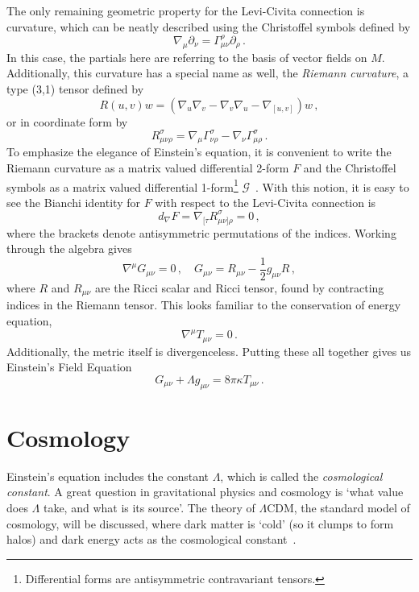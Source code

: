 The only remaining geometric property for the Levi-Civita connection is curvature, which can be neatly described using the Christoffel symbols defined by
\begin{equation}
    \nabla_\mu\partial_\nu = \Gamma^{\rho}_{\mu\nu}\partial_\rho\,.
\end{equation}
In this case, the partials here are referring to the basis of vector fields on $M$. Additionally, this curvature has a special name as well, the \textit{Riemann curvature}, a type (3,1) tensor defined by
\begin{equation}
    R(u,v)w = (\nabla_u\nabla_v-\nabla_v\nabla_u - \nabla_{[u,v]})w\,,
\end{equation}
or in coordinate form by
\begin{equation}
    R_{\mu\nu\rho}^\sigma  = \nabla_\mu \Gamma^\sigma_{\nu\rho} - \nabla_\nu\Gamma^{\sigma}_{\mu\rho}\,.
\end{equation}
To emphasize the elegance of Einstein's equation, it is convenient to write the Riemann curvature as a matrix valued differential 2-form $F$ and the Christoffel symbols as a matrix valued differential 1-form\footnote{Differential forms are antisymmetric contravariant tensors.} $\mathcal{G}$~\cite{baez_john_gauge_1994}. With this notion, it is easy to see the Bianchi identity for $F$ with respect to the Levi-Civita connection is
\begin{equation}
    d_{\nabla}F = \nabla_{[\tau}R^\sigma_{\mu\nu]\rho} = 0\,,
\end{equation}
where the brackets denote antisymmetric permutations of the indices. Working through the algebra gives
\begin{equation}
    \nabla^\mu G_{\mu\nu} = 0\,,\quad G_{\mu\nu} = R_{\mu\nu}-\frac{1}{2}g_{\mu\nu}R\,,
\end{equation}
where $R$ and $R_{\mu\nu}$ are the Ricci scalar and Ricci tensor, found by contracting indices in the Riemann tensor. This looks familiar to the conservation of energy equation,
\begin{equation}
    \nabla^\mu T_{\mu\nu}=0\,.
\end{equation}
Additionally, the metric itself is divergenceless. Putting these all together gives us Einstein's Field Equation
\begin{equation}
    G_{\mu\nu} + \Lambda g_{\mu\nu} = 8\pi\kappa T_{\mu\nu}\,.
\end{equation}

\section{Cosmology}
Einstein's equation includes the constant $\Lambda$, which is called the \textit{cosmological constant}. A great question in gravitational physics and cosmology is `what value does $\Lambda$ take, and what is its source'. The theory of $\Lambda$CDM, the standard model of cosmology, will be discussed, where dark matter is `cold' (so it clumps to form halos) and dark energy acts as the cosmological constant~\cite{scott_dodelson_modern_2021}.


